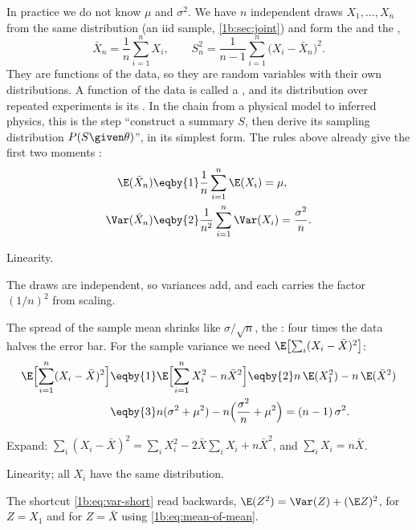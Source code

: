 In practice we do not know $\mu$ and $\sigma^2$. We have $n$ independent draws
$X_1,\dots,X_n$ from the same distribution (an iid sample, \cref{1b:sec:joint})
and form the  and the 
,
\begin{equation}
  \bar X_n=\frac1n\sum_{i=1}^nX_i,\qquad
  S_n^2=\frac1{n-1}\sum_{i=1}^n\bigl(X_i-\bar X_n\bigr)^2 .
  \label{1b:eq:sample-moments}
\end{equation}
They are functions of the data, so they are random variables with their own
distributions. A function of the data is called a , and
its distribution over repeated experiments is its
 . In the chain
from a physical model to inferred physics, this is the step ``construct a
summary $S$, then derive its sampling distribution $P(S\given\theta)$'', in its
simplest form. The rules above already give the first two moments
:
\begin{align}
  \E(\bar X_n)&\eqby{1}\frac1n\sum_{i=1}^n\E(X_i)=\mu,\nonumber\\
  \Var(\bar X_n)&\eqby{2}\frac1{n^2}\sum_{i=1}^n\Var(X_i)=\frac{\sigma^2}{n}.
  \label{1b:eq:mean-of-mean}
\end{align}
\begin{explain}
  \item Linearity.
  \item The draws are independent, so variances add, and each carries the
        factor $(1/n)^2$ from scaling.
\end{explain}
The spread of the sample mean shrinks like $\sigma/\sqrt n$, the
: four times the data halves the error
bar. For the sample variance we need $\E\bigl[\sum_i(X_i-\bar X)^2\bigr]$:
\begin{align*}
  \E\Bigl[\sum_{i=1}^n(X_i-\bar X)^2\Bigr]
  &\eqby{1} \E\Bigl[\sum_{i=1}^nX_i^2-n\bar X^2\Bigr]
   \eqby{2} n\,\E(X_1^2)-n\,\E(\bar X^2)\\
  &\eqby{3} n(\sigma^2+\mu^2)-n\Bigl(\frac{\sigma^2}{n}+\mu^2\Bigr)
   = (n-1)\,\sigma^2 .
\end{align*}
\begin{explain}
  \item Expand: $\sum_i(X_i-\bar X)^2=\sum_iX_i^2-2\bar X\sum_iX_i+n\bar X^2$,
        and $\sum_iX_i=n\bar X$.
  \item Linearity; all $X_i$ have the same distribution.
  \item The shortcut \eqref{1b:eq:var-short} read backwards,
        $\E(Z^2)=\Var(Z)+(\E Z)^2$, for $Z=X_1$ and for $Z=\bar X$ using
        \eqref{1b:eq:mean-of-mean}.
\end{explain}
